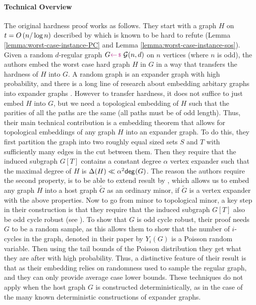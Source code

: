 \documentclass[11pt]{article}
\begin{document}
\paragraph{Technical Overview} The original hardness proof works as follows.
They start with a graph $H$ on $t = O\left(n/\log n\right)$ described by \citet{buss1999linear} which is known to be hard to refute (Lemma \ref{lemma:worst-case-instance-PC} and Lemma \ref{lemma:worst-case-instance-sos}).
Given a random $d$-regular graph $G\samples \mathcal{G}(n, d)$ on $n$ vertices (where $n$ is odd), the authors embed the worst case hard graph $H$ in $G$ in a way that transfers the hardness of $H$ into $G$.
A random graph is an expander graph with high probability, and there is a long line of research about embedding arbitary graphs into expander graphs \citep{krivelevich2019completeminorsgraphssparse, kleinberg1996short}.
However to transfer hardness, it does not suffice to just embed $H$ into $G$, but we need a topological embedding of $H$ such that the parities of all the paths are the same (all paths must be of odd length).
Thus, their main technical contribution is a embedding theorem that allows for  topological embeddings of any graph $H$ into an expander graph.
To do this, they first partition the graph into two roughly equal sized sets $S$ and $T$ with sufficiently many edges in the cut between them.
Then they require that the induced subgraph $G[T]$ contains a constant degree $\alpha$ vertex expander such that the maximal degree of $H$ is $\Delta(H) \ll \alpha^2 \mathsf{deg}_{}(G)$.
The reason the authors require the second property, is to be able to extend result by \citet{krivelevich2019completeminorsgraphssparse}, which allows us to embed any graph $H$ into a host graph $\tilde{G}$ as an ordinary minor, if $\tilde{G}$ is a vertex expander with the above properties.
Now to go from minor to topological minor, a key step in their construction is that they require that the induced subgraph $G[T]$ also be odd cycle robust (see \citep[Definition 3.2]{Austrin_2022}).
To show that $G$ is odd cycle robust, their proof needs $G$ to be a random sample, as this allows them to show that the number of $i$-cycles in the graph, denoted in their paper by $Y_i(G)$ is a Poisson random variable.
Then using the tail bounds of the Poisson distribution they get what they are after with high probability.
Thus, a distinctive feature of their result is that as their embedding relies on randomness used to sample the regular graph, and they can only provide average case lower bounds.
These techniques do not apply when the host graph $G$ is constructed deterministically, as in the case of the many known deterministic constructions of expander graphs.\par
\end{document}
